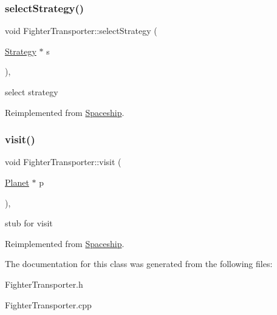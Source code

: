 \subsubsection{\texorpdfstring{select\+Strategy()}{selectStrategy()}}
{\footnotesize\ttfamily void Fighter\+Transporter\+::select\+Strategy (\begin{DoxyParamCaption}\item[{\hyperlink{classStrategy}{Strategy} $\ast$}]{s }\end{DoxyParamCaption})\hspace{0.3cm}{\ttfamily [inline]}, {\ttfamily [virtual]}}

select strategy 

Reimplemented from \hyperlink{classSpaceship_a93be2d9d2b675ef978d866d4cd7a6524}{Spaceship}.

\mbox{\label{classFighterTransporter_a9b7b1f27703841220d86ec142ceda43a}} 
\subsubsection{\texorpdfstring{visit()}{visit()}}
{\footnotesize\ttfamily void Fighter\+Transporter\+::visit (\begin{DoxyParamCaption}\item[{\hyperlink{classPlanet}{Planet} $\ast$}]{p }\end{DoxyParamCaption})\hspace{0.3cm}{\ttfamily [inline]}, {\ttfamily [virtual]}}

stub for visit 

Reimplemented from \hyperlink{classSpaceship}{Spaceship}.



The documentation for this class was generated from the following files\+:\begin{DoxyCompactItemize}
\item 
Fighter\+Transporter.\+h\item 
Fighter\+Transporter.\+cpp\end{DoxyCompactItemize}
